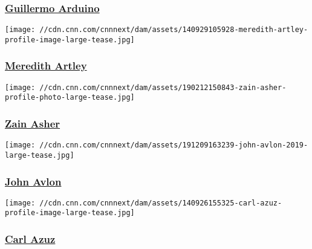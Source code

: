 \hypertarget{guillermo-arduino}{%
\subsubsection{\texorpdfstring{\href{/profiles/guillermo-arduino-profile}{Guillermo
Arduino}}{Guillermo Arduino}}\label{guillermo-arduino}}

\href{/profiles/meredith-artley-profile}{}

\texttt{[image: //cdn.cnn.com/cnnnext/dam/assets/140929105928-meredith-artley-profile-image-large-tease.jpg]}

\hypertarget{meredith-artley}{%
\subsubsection{\texorpdfstring{\href{/profiles/meredith-artley-profile}{Meredith
Artley}}{Meredith Artley}}\label{meredith-artley}}

\href{/profiles/zain-asher-profile}{}

\texttt{[image: //cdn.cnn.com/cnnnext/dam/assets/190212150843-zain-asher-profile-photo-large-tease.jpg]}

\hypertarget{zain-asher}{%
\subsubsection{\texorpdfstring{\href{/profiles/zain-asher-profile}{Zain
Asher}}{Zain Asher}}\label{zain-asher}}

\href{/profiles/john-avlon-profie}{}

\texttt{[image: //cdn.cnn.com/cnnnext/dam/assets/191209163239-john-avlon-2019-large-tease.jpg]}

\hypertarget{john-avlon-}{%
\subsubsection{\texorpdfstring{\href{/profiles/john-avlon-profie}{John
Avlon }}{John Avlon }}\label{john-avlon-}}

\href{/profiles/carl-azuz}{}

\texttt{[image: //cdn.cnn.com/cnnnext/dam/assets/140926155325-carl-azuz-profile-image-large-tease.jpg]}

\hypertarget{carl-azuz}{%
\subsubsection{\texorpdfstring{\href{/profiles/carl-azuz}{Carl
Azuz}}{Carl Azuz}}\label{carl-azuz}}

